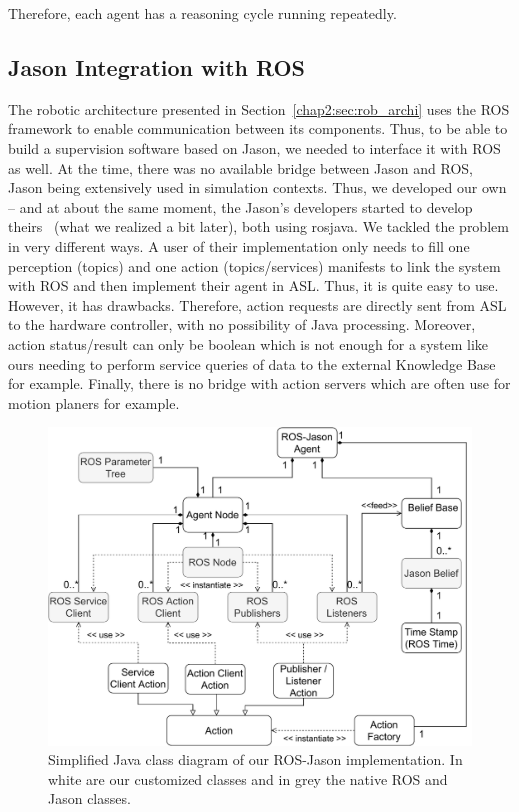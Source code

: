 \documentclass[a4paper,11pt,twoside]{StyleThese}
\begin{document}
Therefore, each agent has a reasoning cycle running repeatedly.

\subsection{Jason Integration with ROS}
The robotic architecture presented in Section~\ref{chap2:sec:rob_archi} uses the ROS framework\cite{quigley_2009_ros} to enable communication between its components. Thus, to be able to build a supervision software based on Jason, we needed to interface it with ROS as well. At the time, there was no available bridge between Jason and ROS, Jason being extensively used in simulation contexts. Thus, we developed our own -- and at about the same moment, the Jason's developers started to develop theirs~\cite{silva_2020_embedded} (what we realized a bit later), both using rosjava. We tackled the problem in very different ways. A user of their implementation only needs to fill one perception (topics) and one action (topics/services) manifests to link the system with ROS and then implement their agent in ASL. Thus, it is quite easy to use. However, it has drawbacks. Therefore, action requests are directly sent from ASL to the hardware controller, with no possibility of Java processing. Moreover, action status/result can only be boolean which is not enough for a system like ours needing to perform service queries of data to the external Knowledge Base for example. Finally, there is no bridge with action servers which are often use for motion planers for example. 

\begin{figure}[!ht]
	\includegraphics[width=\linewidth]{figures/chapter2/RJS_diagram.pdf}
	\caption{Simplified Java class diagram of our ROS-Jason implementation. In white are our customized classes and in grey the native ROS and Jason classes.}
	\label{chap2:fig:rjs}
\end{figure}
\end{document}
